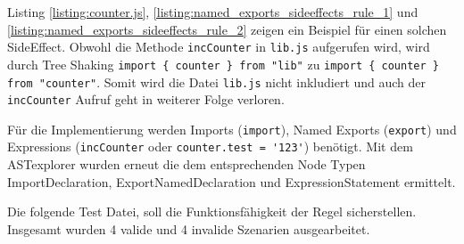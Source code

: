Listing \ref{listing:counter.js}, \ref{listing:named_exports_sideeffects_rule_1} und \ref{listing:named_exports_sideeffects_rule_2} zeigen ein Beispiel für einen solchen SideEffect. Obwohl die Methode \lstinline{incCounter} in \lstinline{lib.js} aufgerufen wird, wird durch Tree Shaking \lstinline|import { counter } from "lib"| zu \lstinline|import { counter } from "counter"|. Somit wird die Datei \lstinline{lib.js} nicht inkludiert und auch der \lstinline{incCounter} Aufruf geht in weiterer Folge verloren.

Für die Implementierung werden Imports (\lstinline{import}), Named Exports  (\lstinline{export}) und Expressions (\lstinline{incCounter} oder \lstinline{counter.test = '123'}) benötigt. Mit dem ASTexplorer wurden erneut die dem entsprechenden Node Typen ImportDeclaration, ExportNamedDeclaration und ExpressionStatement ermittelt.

Die folgende Test Datei, soll die Funktionsfähigkeit der Regel sicherstellen. Insgesamt wurden 4 valide und 4 invalide Szenarien ausgearbeitet.

